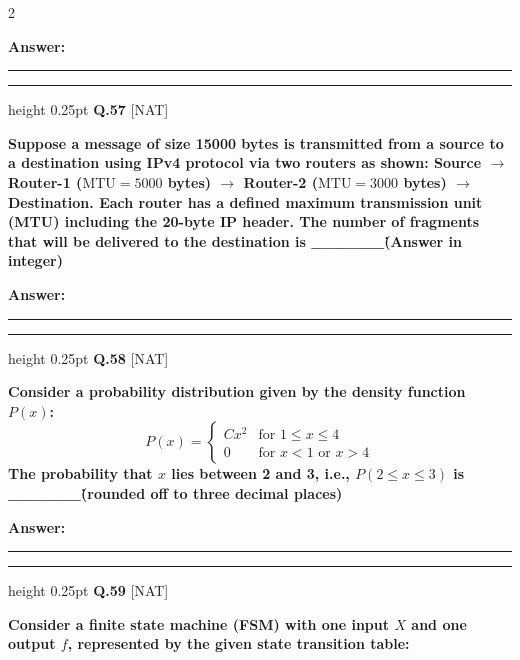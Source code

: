 \documentclass[a4paper,10pt,twoside]{article}
\begin{document}
\begin{multicols}{2}
\par\vspace{3pt}\noindent\textbf{Answer:} \rule{3.2cm}{0.4pt}
\par\vspace{6pt}\hrule height 0.25pt\vspace{6pt}
\noindent\textbf{Q.57} \hfill {\footnotesize\textsf{[NAT]}}
\par\vspace{2pt}
{\bfseries Suppose a message of size 15000 bytes is transmitted from a source to a destination using IPv4 protocol via two routers as shown: Source $\to$ Router-1 ($\text{MTU} = 5000$ bytes) $\to$ Router-2 ($\text{MTU} = 3000$ bytes) $\to$ Destination. Each router has a defined maximum transmission unit (MTU) including the 20-byte IP header. The number of fragments that will be delivered to the destination is \_\_\_\_\_\_\. (Answer in integer) \par}
\par\vspace{3pt}\noindent\textbf{Answer:} \rule{3.2cm}{0.4pt}
\par\vspace{6pt}\hrule height 0.25pt\vspace{6pt}
\noindent\textbf{Q.58} \hfill {\footnotesize\textsf{[NAT]}}
\par\vspace{2pt}
{\bfseries Consider a probability distribution given by the density function $P(x)$:
\[ P(x) = \begin{cases} C x^2 & \text{for } 1 \le x \le 4 \\ 0 & \text{for } x < 1 \text{ or } x > 4 \end{cases} \]
The probability that $x$ lies between 2 and 3, i.e., $P(2 \le x \le 3)$ is \_\_\_\_\_\_\. (rounded off to three decimal places) \par}
\par\vspace{3pt}\noindent\textbf{Answer:} \rule{3.2cm}{0.4pt}
\par\vspace{6pt}\hrule height 0.25pt\vspace{6pt}
\noindent\textbf{Q.59} \hfill {\footnotesize\textsf{[NAT]}}
\par\vspace{2pt}
{\bfseries Consider a finite state machine (FSM) with one input $X$ and one output $f$, represented by the given state transition table:
\par\smallskip
\begin{tabular}{|c|cc|cc|}

\end{tabular}}
\end{multicols}
\end{document}

